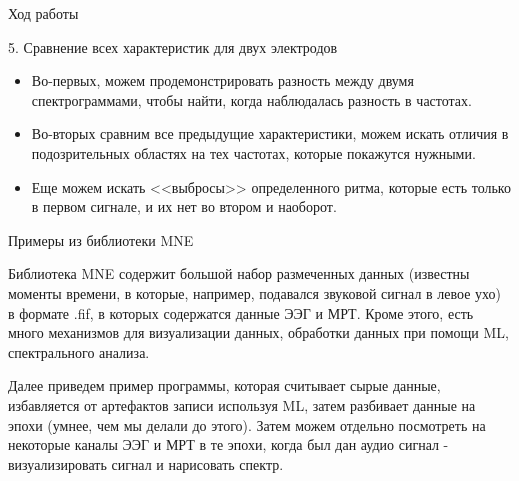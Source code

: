 \documentclass[10pt, red]{beamer}
\begin{document}
\begin{frame}{Ход работы}

5. Сравнение всех характеристик для двух электродов
\begin{itemize}
    \item Во-первых, можем продемонстрировать разность между двумя спектрограммами, чтобы найти, когда наблюдалась разность в частотах.
    \item Во-вторых сравним все предыдущие характеристики, можем искать отличия в подозрительных областях на тех частотах, которые покажутся нужными.
    \item Еще можем искать <<выбросы>> определенного ритма, которые есть только в первом сигнале, и их нет во втором и наоборот.
\end{itemize}
    
\end{frame}

\begin{frame}{Примеры из библиотеки MNE}

Библиотека MNE содержит большой набор размеченных данных (известны моменты времени, в которые, например, подавался звуковой сигнал в левое ухо) в формате .fif, в которых содержатся данные ЭЭГ и МРТ. Кроме этого, есть много механизмов для визуализации данных, обработки данных при помощи ML, спектрального анализа.

\hspace{20}

Далее приведем пример программы, которая считывает сырые данные, избавляется от артефактов записи используя ML, затем разбивает данные на эпохи (умнее, чем мы делали до этого). Затем можем отдельно посмотреть на некоторые каналы ЭЭГ и МРТ в те эпохи, когда был дан аудио сигнал - визуализировать сигнал и нарисовать спектр.

\end{frame}
\end{document}
